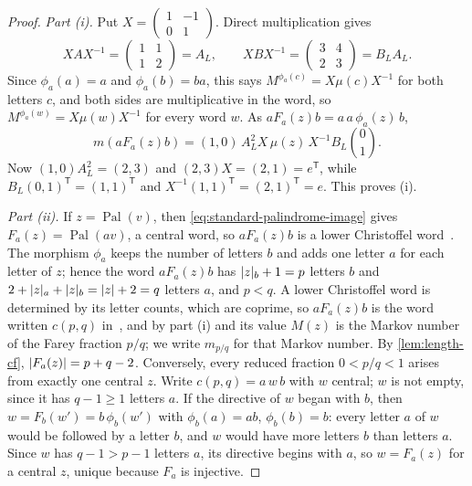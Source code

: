 \begin{proof}
\emph{Part (i).} Put $X=\left(\begin{smallmatrix}1&-1\\0&1\end{smallmatrix}\right)$. Direct
multiplication gives
$$
 XAX^{-1}=\begin{pmatrix}1&1\\1&2\end{pmatrix}=A_L,\qquad
 XBX^{-1}=\begin{pmatrix}3&4\\2&3\end{pmatrix}=B_LA_L .
$$
Since $\phi_a(a)=a$ and $\phi_a(b)=ba$, this says $M^{\phi_a(c)}=X\mu(c)X^{-1}$ for both letters $c$,
and both sides are multiplicative in the word, so $M^{\phi_a(w)}=X\mu(w)X^{-1}$ for every word $w$.
As $aF_a(z)b=a\,a\,\phi_a(z)\,b$,
$$
 m(aF_a(z)b)=(1,0)\,A_L^2X\,\mu(z)\,X^{-1}B_L\binom01 .
$$
Now $(1,0)A_L^2=(2,3)$ and $(2,3)X=(2,1)=e^{\mathsf T}$, while $B_L(0,1)^{\mathsf T}=(1,1)^{\mathsf T}$
and $X^{-1}(1,1)^{\mathsf T}=(2,1)^{\mathsf T}=e$. This proves (i).

\emph{Part (ii).} If $z=\operatorname{Pal}(v)$, then
\eqref{eq:standard-palindrome-image} gives $F_a(z)=\operatorname{Pal}(av)$, a central word, so
$aF_a(z)b$ is a lower Christoffel word~\cite[Section~3]{BertheDeLucaReutenauer2008}. The morphism
$\phi_a$ keeps the number of letters $b$ and adds one letter $a$ for each letter of $z$; hence the
word $aF_a(z)b$ has $\lvert z\rvert_b+1=p$ letters $b$ and $2+\lvert z\rvert_a+\lvert z\rvert_b=\lvert z\rvert+2=q$ letters $a$, and
$p<q$. A lower Christoffel word is determined by its letter counts, which are coprime, so
$aF_a(z)b$ is the word written $c(p,q)$ in~\cite{LagisquetEtAl2021}, and by part (i) and
\cite[Proposition~3]{LagisquetEtAl2021} its value $M(z)$ is the Markov number of the Farey fraction
$p/q$; we write $m_{p/q}$ for that Markov number. By \cref{lem:length-cf}, $\lvert F_a(z)\rvert=p+q-2$.
Conversely, every reduced fraction $0<p/q<1$ arises from exactly one central $z$. Write
$c(p,q)=a\,w\,b$ with $w$ central; $w$ is not empty, since it has $q-1\geqslant1$ letters $a$. If the
directive of $w$ began with $b$, then $w=F_b(w')=b\,\phi_b(w')$ with $\phi_b(a)=ab$, $\phi_b(b)=b$:
every letter $a$ of $w$ would be followed by a letter $b$, and $w$ would have more letters $b$ than
letters $a$. Since $w$ has $q-1>p-1$ letters $a$, its directive begins with $a$, so $w=F_a(z)$ for a
central $z$, unique because $F_a$ is injective.


\end{proof}
